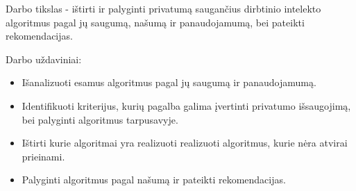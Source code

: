 \documentclass{VUMIFInfBakalaurinis}
\begin{document}
	\par Darbo tikslas - ištirti ir palyginti privatumą saugančius dirbtinio intelekto algoritmus pagal jų saugumą, našumą ir panaudojamumą, bei pateikti rekomendacijas.
	\par Darbo uždaviniai:
	\begin{itemize}
		\item Išanalizuoti esamus algoritmus pagal jų saugumą ir panaudojamumą.
		\item Identifikuoti kriterijus, kurių pagalba galima įvertinti privatumo išsaugojimą, bei palyginti algoritmus tarpusavyje.
		\item Ištirti kurie algoritmai yra realizuoti realizuoti algoritmus, kurie nėra atvirai prieinami.
		\item Palyginti algoritmus pagal našumą ir pateikti rekomendacijas.
	\end{itemize}
\end{document}
